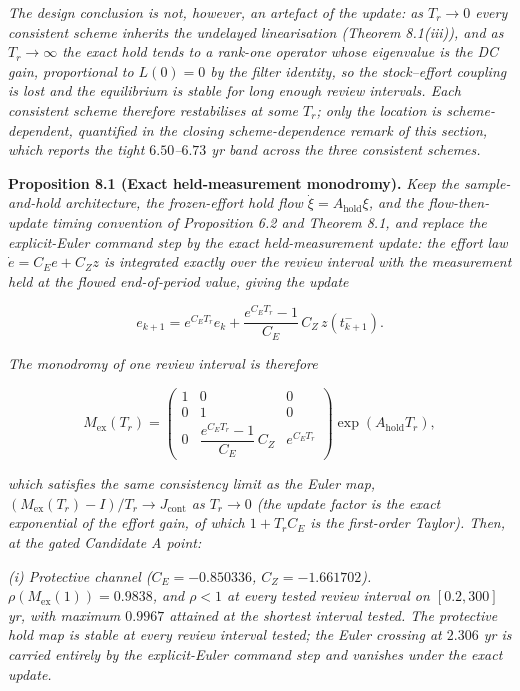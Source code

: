 \documentclass[11pt]{article}
\begin{document}
\emph{The design conclusion is not, however, an artefact of the update:
as \(T_r \to 0\) every consistent scheme inherits the undelayed
linearisation (Theorem 8.1(iii)), and as \(T_r \to \infty\) the exact
hold tends to a rank-one operator whose eigenvalue is the DC gain,
proportional to \(L(0) = 0\) by the filter identity, so the
stock--effort coupling is lost and the equilibrium is stable for long
enough review intervals. Each consistent scheme therefore restabilises
at some \(T_r\); only the location is scheme-dependent, quantified in
the closing scheme-dependence remark of this section, which reports the
tight \(6.50\)--\(6.73\) yr band across the three consistent schemes.}

\textbf{Proposition 8.1 (Exact held-measurement monodromy).} \emph{Keep
the sample-and-hold architecture, the frozen-effort hold flow
\(\dot\xi = A_{\mathrm{hold}}\xi\), and the flow-then-update timing
convention of Proposition 6.2 and Theorem 8.1, and replace the
explicit-Euler command step by the exact held-measurement update: the
effort law \(\dot e = C_E e + C_Z z\) is integrated exactly over the
review interval with the measurement held at the flowed end-of-period
value, giving the update}

\[e_{k+1} = e^{C_E T_r} e_k + \frac{e^{C_E T_r} - 1}{C_E}\, C_Z\, z(t_{k+1}^-).\]

\emph{The monodromy of one review interval is therefore}

\[M_{\mathrm{ex}}(T_r) = \begin{pmatrix} 1 & 0 & 0 \\ 0 & 1 & 0 \\ 0 & \dfrac{e^{C_E T_r}-1}{C_E}\,C_Z & e^{C_E T_r} \end{pmatrix} \exp(A_{\mathrm{hold}} T_r), \tag{13}\]

\emph{which satisfies the same consistency limit as the Euler map,
\((M_{\mathrm{ex}}(T_r) - I)/T_r \to J_{\mathrm{cont}}\) as
\(T_r \to 0\) (the update factor is the exact exponential of the effort
gain, of which \(1 + T_r C_E\) is the first-order Taylor). Then, at the
gated Candidate A point:}

\emph{(i) Protective channel (\(C_E = -0.850336\), \(C_Z = -1.661702\)).
\(\rho(M_{\mathrm{ex}}(1)) = 0.9838\), and \(\rho < 1\) at every tested
review interval on \([0.2, 300]\) yr, with maximum \(0.9967\) attained
at the shortest interval tested. The protective hold map is stable at
every review interval tested; the Euler crossing at \(2.306\) yr is
carried entirely by the explicit-Euler command step and vanishes under
the exact update.}
\end{document}
